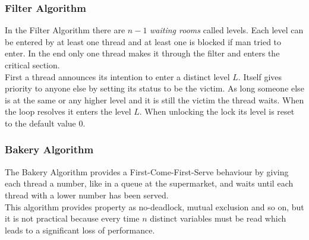 \documentclass{article}
\begin{document}
\begin{adjustwidth}{2em}{2em}
\begin{adjustwidth}{2em}{2em}
			\subsubsection{Filter Algorithm}
			\begin{adjustwidth}{1em}{}
				In the Filter Algorithm there are $n-1$ \textit{waiting rooms} called levels. Each level can be entered by at least one thread and at least one is blocked if man tried to enter. In the end only one thread makes it through the filter and enters the critical section. \\
				First a thread announces its intention to enter a distinct level $L$. Itself gives priority to anyone else by setting its status to be the victim. As long someone else is at the same or any higher level and it is still the victim the thread waits. When the loop resolves it enters the level $L$. When unlocking the lock its level is reset to the default value $0$.
			\end{adjustwidth}
			\subsubsection{Bakery Algorithm}
			\begin{adjustwidth}{1em}{}
				The Bakery Algorithm provides a First-Come-First-Serve behaviour by giving each thread a number, like in a queue at the supermarket, and waits until each thread with a lower number has been served. \\
				This algorithm provides property as no-deadlock, mutual exclusion and so on, but it is not practical because every time $n$ distinct variables must be read which leads to a significant loss of performance.
			\end{adjustwidth}
		\end{adjustwidth}
	\end{adjustwidth}
	
\end{document}

